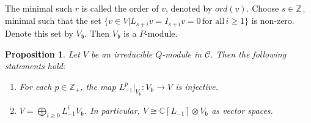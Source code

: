 \documentclass[a4paper]{amsart}
\numberwithin{equation}{section}
\newtheorem{proposition}[theorem]{Proposition}
\begin{document}
The minimal such $r$ is called the order of $v$, denoted by $ord(v)$. Choose $s\in \mathbb{Z}_{+}$ minimal such that the set $\{v\in V | L_{s+i}v=I_{s+i}v=0 \, \text{for all} \,i\ge 1\}$ is non-zero. Denote this set by $V_{\mathfrak b}$. Then $V_{\mathfrak b}$ is a $P$-module.
\begin{proposition}\label{prop4.6}
Let $V$ be an irreducible $Q$-module in $\mathcal{C}$. 
 Then the following statements hold:

\begin{enumerate}
    \item For each $p\in\mathbb Z_+$, the map
    $ L_{-1}^p\big|_{V_{\mathfrak{b}}}:V_{\mathfrak{b}}\to V$ is injective.
    \item $V=\bigoplus_{i\geq 0}L_{-1}^iV_{\mathfrak{b}}$.
    In particular, $ V\cong \mathbb C[L_{-1}]\otimes V_{\mathfrak{b}}$ as vector spaces.
\end{enumerate}
\end{proposition}
\end{document}
